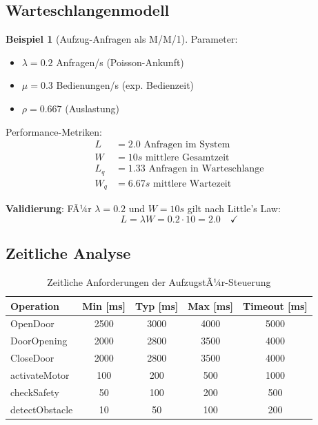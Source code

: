 ﻿\documentclass[a4paper,12pt]{scrreprt}
\theoremstyle{definition}
\newtheorem{beispiel}{Beispiel}[section]
\begin{document}
\subsection{Warteschlangenmodell}

\begin{beispiel}[Aufzug-Anfragen als M/M/1]
	Parameter:
	\begin{itemize}
		\item[-] $\lambda = 0.2$ Anfragen/s (Poisson-Ankunft)
		\item[-] $\mu = 0.3$ Bedienungen/s (exp. Bedienzeit)
		\item[-] $\rho = 0.667$ (Auslastung)
	\end{itemize}
	
	Performance-Metriken:
	\begin{align*}
		L &= 2.0 \text{ Anfragen im System} \\
		W &= 10s \text{ mittlere Gesamtzeit} \\
		L_q &= 1.33 \text{ Anfragen in Warteschlange} \\
		W_q &= 6.67s \text{ mittlere Wartezeit}
	\end{align*}
	
	\textbf{Validierung}: FÃ¼r $\lambda = 0.2$ und $W = 10s$ gilt nach Little's Law:
	\[
	L = \lambda W = 0.2 \cdot 10 = 2.0 \quad \checkmark
	\]
\end{beispiel}

\subsection{Zeitliche Analyse}

\begin{table}[h]
	\centering
	\begin{tabular}{@{}lcccc@{}}
		\toprule
		\textbf{Operation} & \textbf{Min [ms]} & \textbf{Typ [ms]} & \textbf{Max [ms]} & \textbf{Timeout [ms]} \\
		\midrule
		OpenDoor & 2500 & 3000 & 4000 & 5000 \\
		DoorOpening & 2000 & 2800 & 3500 & 4000 \\
		CloseDoor & 2000 & 2800 & 3500 & 4000 \\
		activateMotor & 100 & 200 & 500 & 1000 \\
		checkSafety & 50 & 100 & 200 & 500 \\
		detectObstacle & 10 & 50 & 100 & 200 \\
		\bottomrule
	\end{tabular}
	\caption{Zeitliche Anforderungen der AufzugstÃ¼r-Steuerung}
	\label{tab:timing-analysis}
\end{table}
\end{document}

